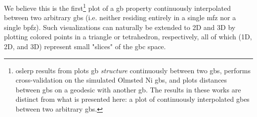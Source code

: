 \documentclass[final,twocolumn,12pt]{elsarticle}
\begin{document}
We believe this is the first\footnote{\Gls{oslerp} results from \citet{francisGeodesicOctonionMetric2019} plots \gls{gb} \emph{structure} continuously between two \glspl{gb}, \citet{chesserLearningGrainBoundary2020} performs cross-validation on the simulated Olmsted Ni \glspl{gb}, and \cite{morawiecDistancesGrainInterfaces2019} plots distances between \glspl{gb} on a geodesic with another \gls{gb}. The results in these works are distinct from what is presented here: a plot of continuously interpolated \glspl{gbe} between two arbitrary \glspl{gb}.} plot of a \gls{gb} property continuously interpolated between two arbitrary \glspl{gb} (i.e. neither residing entirely in a single \gls{mfz} nor a single \gls{bpfz}). Such visualizations can naturally be extended to 2D and 3D by plotting colored points in a triangle or tetrahedron, respectively, all of which (1D, 2D, and 3D) represent small "slices" of the \gls{gbc} space.
\end{document}
